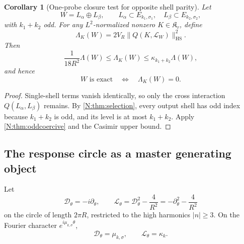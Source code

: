 \documentclass[
 aps,
 prd,
 reprint,
 amsmath,
 amssymb,
 nofootinbib,
 superscriptaddress
]{revtex4-2}
\newtheorem{corollary}[theorem]{Corollary}
\theoremstyle{definition}
\theoremstyle{remark}
\newcommand{\HS}{\mathrm{HS}}
\begin{document}
\begin{corollary}[One-probe closure test for opposite shell parity]
\label{N:cor:oneprobeclosure}
Let
\[
 W=L_\alpha\oplus L_\beta,
 \qquad
 L_\alpha\subset E_{k_1,\sigma_1},
 \quad
 L_\beta\subset E_{k_2,\sigma_2},
\]
with \(k_1+k_2\) odd.  For any \(L^2\)-normalized nonzero
\(K\in\mathfrak K_\tau\), define
\[
 \Lambda_K(W)
 =
 2V_R
 \|Q(K,\mathcal L_W)\|_{\HS}^2.
\]
Then
\begin{equation}
 \boxed{
 \frac{1}{18R^2}\Lambda(W)
 \le
 \Lambda_K(W)
 \le
 \kappa_{k_1+k_2}\Lambda(W),
 }
 \label{N:eq:oneprobeclosure}
\end{equation}
and hence
\[
       W\text{ is exact}
       \quad\Longleftrightarrow\quad
       \Lambda_K(W)=0.
\]
\end{corollary}

\begin{proof}
Single-shell terms vanish identically, so only the cross interaction
\(Q(L_\alpha,L_\beta)\) remains.  By
\cref{N:thm:selection}, every output shell has odd index because
\(k_1+k_2\) is odd, and its level is at most \(k_1+k_2\).
Apply \cref{N:thm:oddcoercive} and the Casimir upper bound.
\end{proof}

\subsection{The response circle as a master generating object}

Let
\[
 \mathscr D_\theta=-i\partial_\theta,
 \qquad
 \mathscr L_\theta
 =
 \mathscr D_\theta^2-\frac4{R^2}
 =
 -\partial_\theta^2-\frac4{R^2}
\]
on the circle of length \(2\pi R\), restricted to the high harmonics
\(|n|\ge3\).  On the Fourier character
\(e^{i\mu_{k,\sigma}\theta}\),
\[
 \mathscr D_\theta=\mu_{k,\sigma},
 \qquad
 \mathscr L_\theta=\kappa_k.
\]
\end{document}
